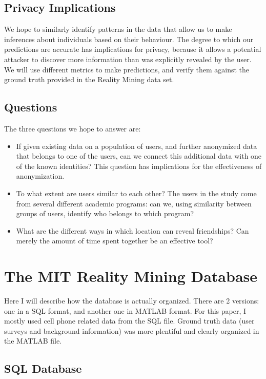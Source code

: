 \documentclass[pageno]{jpaper}
\begin{document}
\subsection{Privacy Implications}
We hope to similarly identify patterns in the data that allow us to make inferences about individuals based on their behaviour. The degree to which our predictions are accurate has implications for privacy, because it allows a potential attacker to discover more information than was explicitly revealed by the user. We will use different metrics to make predictions, and verify them against the ground truth provided in the Reality Mining data set. 

\subsection{Questions}

The three questions we hope to answer are: 
\begin{itemize}
\item If given existing data on a population of users, and further anonymized data that belongs to one of the users, can we connect this additional data with one of the known identities? This question has implications for the effectiveness of anonymization. 
\item To what extent are users similar to each other? The users in the study come from several different academic programs: can we, using similarity between groups of users, identify who belongs to which program? 
\item What are the different ways in which location can reveal friendships? Can merely the amount of time spent together be an effective tool? 
\end{itemize}

\section{The MIT Reality Mining Database}

Here I will describe how the database is actually organized. There are 2 versions: one in a SQL format, and another one in MATLAB format. For this paper, I mostly used cell phone related data from the SQL file. Ground truth data (user surveys and background information) was more plentiful and clearly organized in the MATLAB file.

\subsection{SQL Database}
\end{document}
